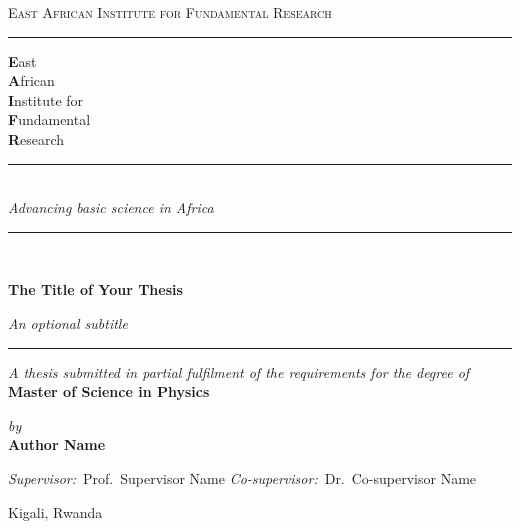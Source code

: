 \documentclass[12pt, a4paper, openany]{book}
\newcommand{\thesistitle}{The Title of Your Thesis}
\newcommand{\thesissubtitle}{An optional subtitle}
\newcommand{\thesisauthor}{Author Name}
\newcommand{\thesisdegree}{Master of Science in Physics}
\newcommand{\thesissupervisor}{Prof.\ Supervisor Name}
\newcommand{\thesiscosupervisor}{Dr.\ Co-supervisor Name}
\newcommand{\thesisyear}{\the\year}
\newcommand{\thesislocation}{Kigali, Rwanda}
\begin{document}
\frontmatter

\begin{titlepage}
\thispagestyle{empty}
\centering

{\scshape\small East African Institute for Fundamental Research}\\[4pt]
\rule{5cm}{0.4pt}

\vfill

{\fontsize{30}{36}\selectfont\rmfamily%
  {\bfseries E}ast\\[-2pt]
  {\bfseries A}frican\\[-2pt]
  {\bfseries I}nstitute for\\[-2pt]
  {\bfseries F}undamental\\[-2pt]
  {\bfseries R}esearch\par}
\vspace{10pt}
\rule{2cm}{0.6pt}\\[8pt]
{\itshape\large Advancing basic science in Africa}

\vfill

\rule{0.6\linewidth}{0.4pt}\\[10pt]
{\Huge\rmfamily\bfseries \thesistitle\par}\vspace{4pt}
{\large\itshape \thesissubtitle}\\[10pt]
\rule{0.6\linewidth}{0.4pt}

\vspace{1.2cm}

{\small\itshape A thesis submitted in partial fulfilment of the requirements for the degree of}\\[4pt]
{\large\bfseries \thesisdegree}

\vspace{1cm}

{\small\itshape by}\\[2pt]
{\Large\bfseries \thesisauthor}

\vspace{1cm}

{\small
  \textit{Supervisor:}~\thesissupervisor\quad\textbullet\quad
  \textit{Co-supervisor:}~\thesiscosupervisor}

\vfill
{\small \thesislocation\ \ \textperiodcentered\ \ \thesisyear}
\restoregeometry
\end{titlepage}
\end{document}
